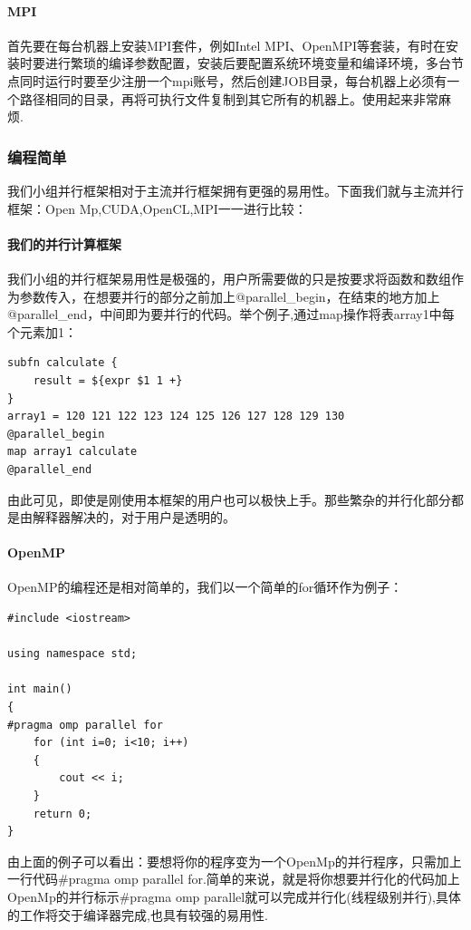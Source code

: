 \documentclass[paper=a4]{ctexart} %
\numberwithin{equation}{section} %
\numberwithin{figure}{section} %
\numberwithin{table}{section} %
\begin{document}
\paragraph{MPI}
    首先要在每台机器上安装MPI套件，例如Intel MPI、OpenMPI等套装，有时在安装时要进行繁琐的编译参数配置，安装后要配置系统环境变量和编译环境，多台节点同时运行时要至少注册一个mpi账号，然后创建JOB目录，每台机器上必须有一个路径相同的目录，再将可执行文件复制到其它所有的机器上。使用起来非常麻烦.

\subsubsection{编程简单}
我们小组并行框架相对于主流并行框架拥有更强的易用性。下面我们就与主流并行框架：Open Mp,CUDA,OpenCL,MPI一一进行比较：

\paragraph{我们的并行计算框架}
我们小组的并行框架易用性是极强的，用户所需要做的只是按要求将函数和数组作为参数传入，在想要并行的部分之前加上@parallel\_begin，在结束的地方加上@parallel\_end，中间即为要并行的代码。举个例子,通过map操作将表array1中每个元素加1：

\begin{lstlisting}
subfn calculate {
    result = ${expr $1 1 +}
}
array1 = 120 121 122 123 124 125 126 127 128 129 130
@parallel_begin
map array1 calculate
@parallel_end
\end{lstlisting}
由此可见，即使是刚使用本框架的用户也可以极快上手。那些繁杂的并行化部分都是由解释器解决的，对于用户是透明的。

\paragraph{OpenMP}

OpenMP的编程还是相对简单的，我们以一个简单的for循环作为例子：
\begin{lstlisting}
#include <iostream>

using namespace std;

int main()
{
#pragma omp parallel for
    for (int i=0; i<10; i++) 
    {
        cout << i;
    } 
    return 0;
}
\end{lstlisting}
由上面的例子可以看出：要想将你的程序变为一个OpenMp的并行程序，只需加上一行代码\#pragma omp parallel for.简单的来说，就是将你想要并行化的代码加上OpenMp的并行标示\#pragma omp parallel就可以完成并行化(线程级别并行),具体的工作将交于编译器完成,也具有较强的易用性.
\end{document}
